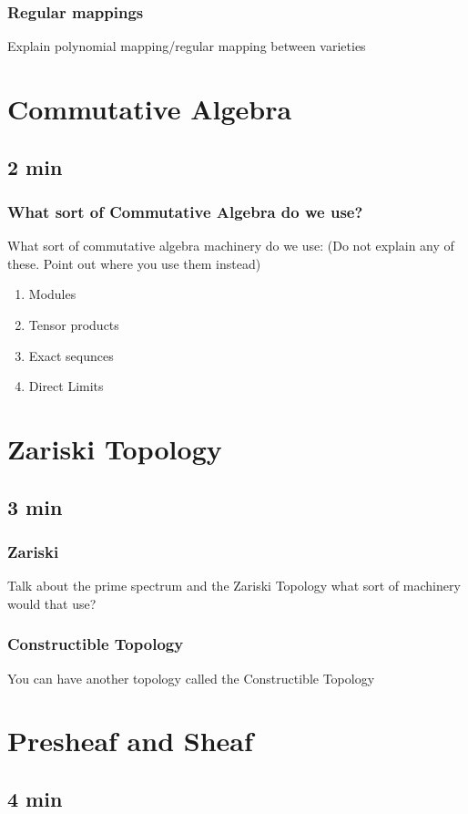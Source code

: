 \documentclass[pdf]{beamer}
\begin{document}
\begin{frame}
    \frametitle{Regular mappings}
    Explain polynomial mapping/regular mapping between varieties
\end{frame}

\section{Commutative Algebra}
\subsection{2 min}

\begin{frame}
    \frametitle{What sort of Commutative Algebra do we use?}
    What sort of commutative algebra machinery do we use: (Do not explain any of these. Point out where you use them instead)
    \begin{enumerate}
        \item Modules
        \item Tensor products
        \item Exact sequnces
        \item Direct Limits
    \end{enumerate}
\end{frame}

\section{Zariski Topology}
\subsection{3 min}

\begin{frame}
    \frametitle{Zariski}
    Talk about the prime spectrum and the Zariski Topology what sort of machinery would that use? 
\end{frame}

\begin{frame}
    \frametitle{Constructible Topology}
    You can have another topology called the Constructible Topology
\end{frame}

\section{Presheaf and Sheaf}
\subsection{4 min}
\end{document}
